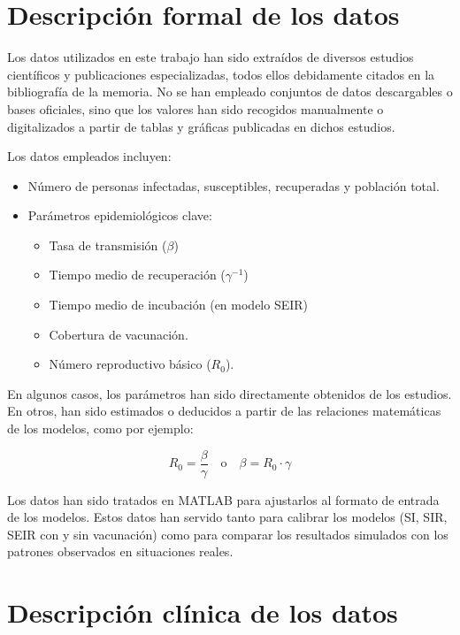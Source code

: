
\section{Descripción formal de los datos}
Los datos utilizados en este trabajo han sido extraídos de diversos estudios científicos y publicaciones especializadas, todos ellos debidamente citados en la bibliografía de la memoria. No se han empleado conjuntos de datos descargables o bases oficiales, sino que los valores han sido recogidos manualmente o digitalizados a partir de tablas y gráficas publicadas en dichos estudios.

Los datos empleados incluyen:
\begin{itemize}
    \item Número de personas infectadas, susceptibles, recuperadas y población total.
    \item Parámetros epidemiológicos clave:
        \begin{itemize}
            \item Tasa de transmisión (\( \beta \))
            \item Tiempo medio de recuperación (\( \gamma^{-1} \))
            \item Tiempo medio de incubación (en modelo SEIR)
            \item Cobertura de vacunación.
            \item Número reproductivo básico (\( R_0 \)).
        \end{itemize}
\end{itemize}

En algunos casos, los parámetros han sido directamente obtenidos de los estudios. En otros, han sido estimados o deducidos a partir de las relaciones matemáticas de los modelos, como por ejemplo:

\[
R_0 = \frac{\beta}{\gamma}
\quad \text{o} \quad
\beta = R_0 \cdot \gamma
\]

\bigskip
Los datos han sido tratados en MATLAB para ajustarlos al formato de entrada de los modelos. 
Estos datos han servido tanto para calibrar los modelos (SI, SIR, SEIR con y sin vacunación) como para comparar los resultados simulados con los patrones observados en situaciones reales.




\section{Descripción clínica de los datos}

